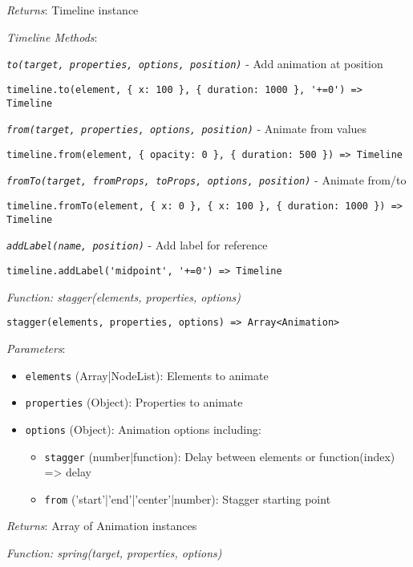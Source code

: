 \documentclass[11pt]{article}
\begin{document}
\emph{Returns}: Timeline instance

\emph{Timeline Methods}:

\emph{\texttt{to(target, properties, options, position)}} - Add animation at position
\begin{verbatim}
timeline.to(element, { x: 100 }, { duration: 1000 }, '+=0') => Timeline
\end{verbatim}

\emph{\texttt{from(target, properties, options, position)}} - Animate from values
\begin{verbatim}
timeline.from(element, { opacity: 0 }, { duration: 500 }) => Timeline
\end{verbatim}

\emph{\texttt{fromTo(target, fromProps, toProps, options, position)}} - Animate from/to
\begin{verbatim}
timeline.fromTo(element, { x: 0 }, { x: 100 }, { duration: 1000 }) => Timeline
\end{verbatim}

\emph{\texttt{addLabel(name, position)}} - Add label for reference
\begin{verbatim}
timeline.addLabel('midpoint', '+=0') => Timeline
\end{verbatim}

\emph{Function: stagger(elements, properties, options)}

\begin{verbatim}
stagger(elements, properties, options) => Array<Animation>
\end{verbatim}

\emph{Parameters}:
\begin{itemize}
\item \texttt{elements} (Array|NodeList): Elements to animate
\item \texttt{properties} (Object): Properties to animate
\item \texttt{options} (Object): Animation options including:
\begin{itemize}
\item \texttt{stagger} (number|function): Delay between elements or function(index) => delay
\item \texttt{from} ('start'|'end'|'center'|number): Stagger starting point
\end{itemize}
\end{itemize}

\emph{Returns}: Array of Animation instances

\emph{Function: spring(target, properties, options)}
\end{document}
